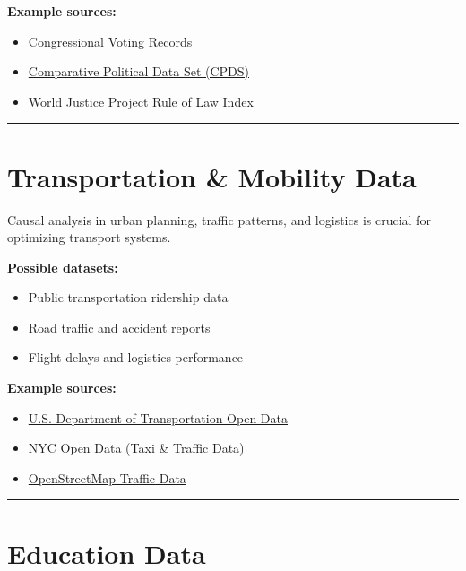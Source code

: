 \documentclass[
  letterpaper,
  DIV=11,
  numbers=noendperiod]{scrreprt}
\begin{document}
\textbf{Example sources:}

\begin{itemize}
\item
  \href{https://www.govtrack.us/}{Congressional Voting Records}
\item
  \href{https://www.cpds-data.org/}{Comparative Political Data Set
  (CPDS)}
\item
  \href{https://worldjusticeproject.org/}{World Justice Project Rule of
  Law Index}
\end{itemize}

\begin{center}\rule{0.5\linewidth}{0.5pt}\end{center}

\section{\texorpdfstring{\textbf{Transportation \& Mobility
Data}}{Transportation \& Mobility Data}}\label{transportation-mobility-data}

Causal analysis in urban planning, traffic patterns, and logistics is
crucial for optimizing transport systems.

\textbf{Possible datasets:}

\begin{itemize}
\item
  Public transportation ridership data
\item
  Road traffic and accident reports
\item
  Flight delays and logistics performance
\end{itemize}

\textbf{Example sources:}

\begin{itemize}
\item
  \href{https://data.transportation.gov/}{U.S. Department of
  Transportation Open Data}
\item
  \href{https://data.cityofnewyork.us/Transportation/Taxi/mch6-rqy4}{NYC
  Open Data (Taxi \& Traffic Data)}
\item
  \href{https://www.openstreetmap.org/}{OpenStreetMap Traffic Data}
\end{itemize}

\begin{center}\rule{0.5\linewidth}{0.5pt}\end{center}

\section{\texorpdfstring{\textbf{Education
Data}}{Education Data}}\label{education-data}
\end{document}
